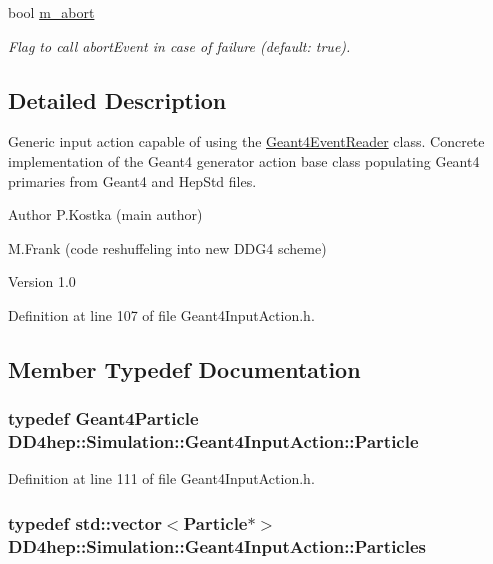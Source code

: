 \begin{DoxyCompactItemize}
bool \hyperlink{class_d_d4hep_1_1_simulation_1_1_geant4_input_action_a87b795b22ac455154122b4f210abf133}{m\_\-abort}
\begin{DoxyCompactList}\small\item\em Flag to call abortEvent in case of failure (default: true). \item\end{DoxyCompactList}\end{DoxyCompactItemize}


\subsection{Detailed Description}
Generic input action capable of using the \hyperlink{class_d_d4hep_1_1_simulation_1_1_geant4_event_reader}{Geant4EventReader} class. Concrete implementation of the Geant4 generator action base class populating Geant4 primaries from Geant4 and HepStd files.

\begin{DoxyAuthor}{Author}
P.Kostka (main author) 

M.Frank (code reshuffeling into new DDG4 scheme) 
\end{DoxyAuthor}
\begin{DoxyVersion}{Version}
1.0 
\end{DoxyVersion}


Definition at line 107 of file Geant4InputAction.h.

\subsection{Member Typedef Documentation}
\hypertarget{class_d_d4hep_1_1_simulation_1_1_geant4_input_action_ab8d227297b50dec5cb769635da56deec}{
\subsubsection[{Particle}]{\setlength{\rightskip}{0pt plus 5cm}typedef {\bf Geant4Particle} {\bf DD4hep::Simulation::Geant4InputAction::Particle}}}
\label{class_d_d4hep_1_1_simulation_1_1_geant4_input_action_ab8d227297b50dec5cb769635da56deec}


Definition at line 111 of file Geant4InputAction.h.\hypertarget{class_d_d4hep_1_1_simulation_1_1_geant4_input_action_ae62b1f5e1be390991dd228e7bb7bcc04}{
\subsubsection[{Particles}]{\setlength{\rightskip}{0pt plus 5cm}typedef std::vector$<${\bf Particle}$\ast$$>$ {\bf DD4hep::Simulation::Geant4InputAction::Particles}}}
\label{class_d_d4hep_1_1_simulation_1_1_geant4_input_action_ae62b1f5e1be390991dd228e7bb7bcc04}


